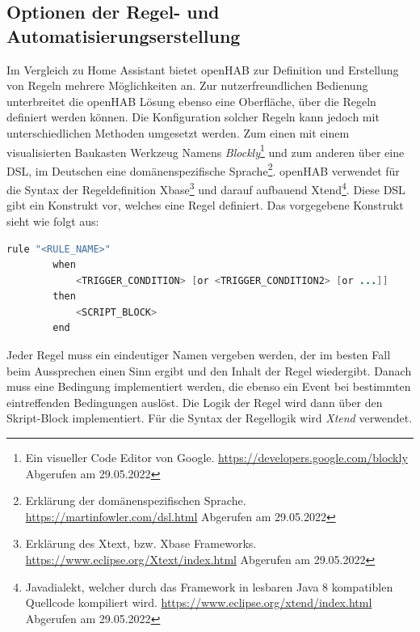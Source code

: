     \subsection{Optionen der Regel- und Automatisierungserstellung}
        Im Vergleich zu Home Assistant bietet openHAB zur Definition und Erstellung von Regeln mehrere Möglichkeiten an. 
        Zur nutzerfreundlichen Bedienung unterbreitet die openHAB Lösung ebenso eine Oberfläche, über die Regeln definiert 
        werden können. Die Konfiguration solcher Regeln kann jedoch mit unterschiedlichen Methoden umgesetzt werden. Zum 
        einen mit einem visualisierten Baukasten Werkzeug Namens \textit{Blockly}\footnote{Ein visueller Code Editor von Google. \url{https://developers.google.com/blockly} Abgerufen am 29.05.2022} 
        und zum anderen über eine \ac{DSL}, im Deutschen eine domänenspezifische Sprache\footnote{Erklärung der domänenspezifischen Sprache. \url{https://martinfowler.com/dsl.html} Abgerufen am 29.05.2022}. 
        openHAB verwendet für die Syntax der Regeldefinition Xbase\footnote{Erklärung des Xtext, bzw. Xbase Frameworks. \url{https://www.eclipse.org/Xtext/index.html} Abgerufen am 29.05.2022} 
        und darauf aufbauend Xtend\footnote{Javadialekt, welcher durch das Framework in lesbaren Java 8 kompatiblen Quellcode kompiliert wird. \url{https://www.eclipse.org/xtend/index.html} Abgerufen am 29.05.2022}. 
        Diese \acs{DSL} gibt ein Konstrukt vor, welches eine Regel definiert. Das vorgegebene Konstrukt sieht wie folgt aus:
        \\
        \begin{lstlisting}[language=Java, frame=lines, xleftmargin=\parindent, style=algoBericht, label={code:Xbase}, captionpos=b, caption={Konstrukt zur Regeldefinition über Xbase}]
        rule "<RULE_NAME>"
        when
            <TRIGGER_CONDITION> [or <TRIGGER_CONDITION2> [or ...]]            
        then
            <SCRIPT_BLOCK>
        end
        \end{lstlisting}
        Jeder Regel muss ein eindeutiger Namen vergeben werden, der im besten Fall beim Aussprechen einen Sinn ergibt und den 
        Inhalt der Regel wiedergibt. Danach muss eine Bedingung implementiert werden, die ebenso ein Event bei bestimmten 
        eintreffenden Bedingungen auslöst. Die Logik der Regel wird dann über den Skript-Block implementiert. Für die Syntax 
        der Regellogik wird \textit{Xtend} verwendet. 

